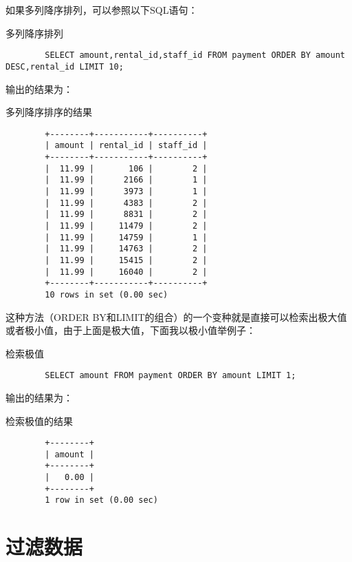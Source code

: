 \documentclass[UTF8]{article}
\begin{document}
如果多列降序排列，可以参照以下SQL语句：
\begin{listing}[H]
	\caption{多列降序排列}
	\label{code:muldescsorder}
	\begin{verbatim}
        SELECT amount,rental_id,staff_id FROM payment ORDER BY amount DESC,rental_id LIMIT 10;
    \end{verbatim}
\end{listing}

输出的结果为：

\begin{listing}[H]
	\caption{多列降序排序的结果}
	\label{code:muldescsorderresult}
	\begin{verbatim}
        +--------+-----------+----------+
        | amount | rental_id | staff_id |
        +--------+-----------+----------+
        |  11.99 |       106 |        2 |
        |  11.99 |      2166 |        1 |
        |  11.99 |      3973 |        1 |
        |  11.99 |      4383 |        2 |
        |  11.99 |      8831 |        2 |
        |  11.99 |     11479 |        2 |
        |  11.99 |     14759 |        1 |
        |  11.99 |     14763 |        2 |
        |  11.99 |     15415 |        2 |
        |  11.99 |     16040 |        2 |
        +--------+-----------+----------+
        10 rows in set (0.00 sec)
\end{verbatim}
\end{listing}

这种方法（ORDER BY和LIMIT的组合）的一个变种就是直接可以检索出极大值或者极小值，由于上面是极大值，下面我以极小值举例子：
\begin{listing}[H]
	\caption{检索极值}
	\label{code:findmaxormin}
	\begin{verbatim}
        SELECT amount FROM payment ORDER BY amount LIMIT 1;
    \end{verbatim}
\end{listing}

输出的结果为：

\begin{listing}[H]
	\caption{检索极值的结果}
	\label{code:findmaxorminresult}
	\begin{verbatim}
        +--------+
        | amount |
        +--------+
        |   0.00 |
        +--------+
        1 row in set (0.00 sec)
        \end{verbatim}
\end{listing}

\section{过滤数据}
\end{document}
